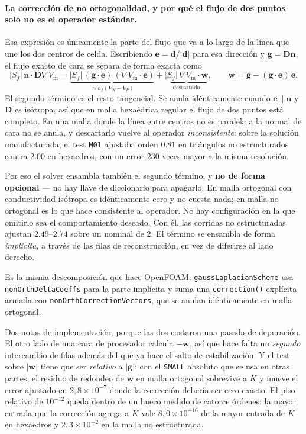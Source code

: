 \documentclass[11pt,a4paper]{article}
\newcommand{\code}[1]{\texttt{\small #1}}
\newcommand{\Vm}{V_{\text{m}}}
\newcommand{\Dten}{\mathbf{D}}
\newcommand{\grad}{\nabla}
\begin{document}
\paragraph{La corrección de no ortogonalidad, y por qué el flujo de dos puntos solo no es
el operador estándar.}
Esa expresión es únicamente la parte del flujo que va a lo largo de la línea que une los dos
centros de celda. Escribiendo $\mathbf{e}=\mathbf{d}/|\mathbf{d}|$ para esa dirección y
$\mathbf{g}=\Dten\mathbf{n}$, el flujo exacto de cara se separa de forma exacta como
\begin{equation}
  |S_f|\,\mathbf{n}\cdot\Dten\grad\Vm
  = \underbrace{|S_f|\,(\mathbf{g}\cdot\mathbf{e})\,(\grad\Vm\cdot\mathbf{e})}
    _{\textstyle \approx a_f (V_N-V_P)}
  + \underbrace{|S_f|\,\grad\Vm\cdot\mathbf{w}}_{\textstyle \text{descartado}},
  \qquad
  \mathbf{w}=\mathbf{g}-(\mathbf{g}\cdot\mathbf{e})\,\mathbf{e}.
\end{equation}
El segundo término es el resto tangencial. Se anula idénticamente cuando
$\mathbf{e}\parallel\mathbf{n}$ y $\Dten$ es isótropa, así que en malla hexaédrica regular el
flujo de dos puntos está completo. En una malla donde la línea entre centros no es paralela a
la normal de cara no se anula, y descartarlo vuelve al operador \emph{inconsistente}: sobre la
solución manufacturada, el test \code{M01} ajustaba orden $0.81$ en triángulos no estructurados
contra $2.00$ en hexaedros, con un error $230$ veces mayor a la misma resolución.

Por eso el solver ensambla también el segundo término, y \textbf{no de forma opcional} --- no
hay llave de diccionario para apagarlo. En malla ortogonal con conductividad isótropa es
idénticamente cero y no cuesta nada; en malla no ortogonal es lo que hace consistente al
operador. No hay configuración en la que omitirlo sea el comportamiento deseado. Con él, las
corridas no estructuradas ajustan $2.49$--$2.74$ sobre un nominal de $2$. El término se ensambla
de forma \emph{implícita}, a través de las filas de reconstrucción, en vez de diferirse al lado
derecho.

Es la misma descomposición que hace OpenFOAM: \code{gaussLaplacianScheme} usa
\code{nonOrthDeltaCoeffs} para la parte implícita y suma una \code{correction()} explícita
armada con \code{nonOrthCorrectionVectors}, que se anulan idénticamente en malla ortogonal.

Dos notas de implementación, porque las dos costaron una pasada de depuración. El otro lado de
una cara de procesador calcula $-\mathbf{w}$, así que hace falta un \emph{segundo} intercambio
de filas además del que ya hace el salto de estabilización. Y el test sobre $|\mathbf{w}|$
tiene que ser \emph{relativo} a $|\mathbf{g}|$: con el \code{SMALL} absoluto que se usa en
otras partes, el residuo de redondeo de $\mathbf{w}$ en malla ortogonal sobrevive a $K$ y mueve
el error ajustado en $2{,}8\times10^{-7}$ donde la corrección debería ser cero exacto. El piso
relativo de $10^{-12}$ queda dentro de un hueco medido de catorce órdenes: la mayor entrada que
la corrección agrega a $K$ vale $8{,}0\times10^{-16}$ de la mayor entrada de $K$ en hexaedros y
$2{,}3\times10^{-2}$ en la malla no estructurada.
\end{document}
